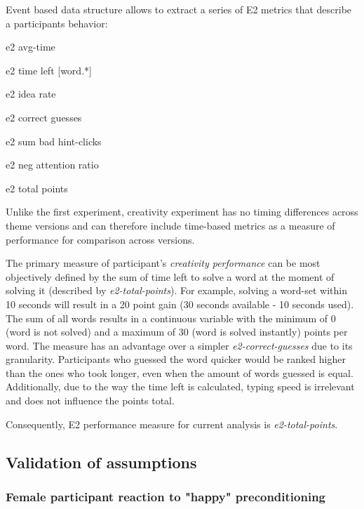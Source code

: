 	Event based data structure allows to extract a series of E2 metrics that describe a participants behavior:
	\begin{itemize*}
		\item e2 avg-time 
		\item e2 time left [word.*]  
		\item e2 idea rate 
		\item e2 correct guesses
		\item e2 sum bad hint-clicks 
		\item e2 neg attention ratio
		\item e2 total points
	\end{itemize*}
	
	Unlike the first experiment, creativity experiment has no timing differences across theme versions and can therefore include time-based metrics as a measure of performance for comparison across versions.
	
	The primary measure of participant's \textit{creativity performance} can be most objectively defined by the sum of time left to solve a word at the moment of solving it (described by \textit{e2-total-points}). For example, solving a word-set within 10 seconds will result in a 20 point gain (30 seconds available - 10 seconds used). The sum of all words results in a continuous variable with the minimum of 0 (word is not solved) and a maximum of 30 (word is solved instantly) points per word. The measure has an advantage over a simpler \textit{e2-correct-guesses} due to its granularity. Participants who guessed the word quicker would be ranked higher than the ones who took longer, even when the amount of words guessed is equal. Additionally, due to the way the time left is calculated, typing speed is irrelevant and does not influence the points total.
	
	Consequently, E2 performance measure for current analysis is \textit{e2-total-points}.
	
	
	
	\subsection{Validation of assumptions} \label{sec:data-validity}
		
		\subsubsection{Female participant reaction to "happy" preconditioning}
		
